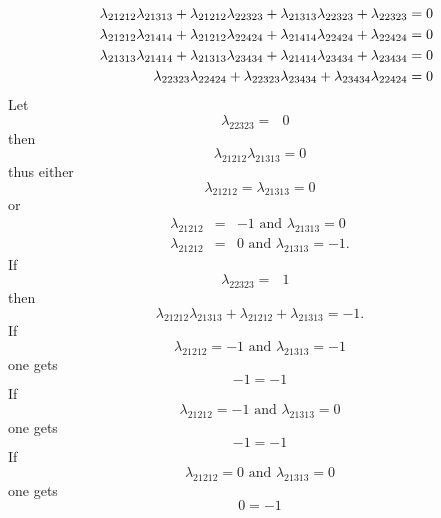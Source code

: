 \documentclass[12pt]{article}
\begin{document}
\begin{eqnarray}
&&\lambda _{21212}\lambda _{21313}+\lambda _{21212}\lambda _{22323}+\lambda
_{21313}\lambda _{22323}+\lambda _{22323}=0  \notag \\
&&\lambda _{21212}\lambda _{21414}+\lambda _{21212}\lambda _{22424}+\lambda
_{21414}\lambda _{22424}+\lambda _{22424}=0  \notag \\
&&\lambda _{21313}\lambda _{21414}+\lambda _{21313}\lambda _{23434}+\lambda
_{21414}\lambda _{23434}+\lambda _{23434}=0  \notag \\
&&\lambda _{22323}\lambda _{22424}+\lambda _{22323}\lambda _{23434}+\lambda
_{23434}\lambda _{22424}=0
\end{eqnarray}%
Let 
\begin{equation}
\lambda _{22323}=\text{ }0\text{ }
\end{equation}%
then 
\begin{equation}
\lambda _{21212}\lambda _{21313}=0
\end{equation}%
thus either 
\begin{equation}
\lambda _{21212}=\lambda _{21313}=0
\end{equation}%
or 
\begin{eqnarray}
\lambda _{21212} &=&-1\text{ and }\lambda _{21313}=0 \\
\lambda _{21212} &=&0\text{ and }\lambda _{21313}=-1.
\end{eqnarray}%
If 
\begin{equation}
\lambda _{22323}=\text{ }1\text{ }
\end{equation}%
then 
\begin{equation}
\lambda _{21212}\lambda _{21313}+\lambda _{21212}+\lambda _{21313}=-1.
\end{equation}%
If 
\begin{equation}
\lambda _{21212}=-1\text{ and }\lambda _{21313}=-1
\end{equation}%
one gets 
\begin{equation}
-1=-1
\end{equation}%
If%
\begin{equation}
\lambda _{21212}=-1\text{ and }\lambda _{21313}=0
\end{equation}%
one gets 
\begin{equation}
-1=-1
\end{equation}%
If%
\begin{equation}
\lambda _{21212}=0\text{ and }\lambda _{21313}=0
\end{equation}%
one gets 
\begin{equation}
0=-1
\end{equation}%
\end{document}
